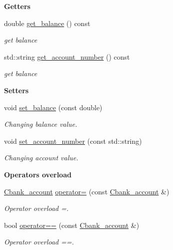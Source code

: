 \begin{Indent}{\bf Getters}\par
\begin{DoxyCompactItemize}
\item 
double \hyperlink{class_cbank__account_a3a04a3ddbbe032c369aa3cf483720f5c}{get\+\_\+balance} () const 
\begin{DoxyCompactList}\small\item\em get balance \end{DoxyCompactList}\item 
std\+::string \hyperlink{class_cbank__account_a666b0e292527ad2886f34a93789ab80d}{get\+\_\+account\+\_\+number} () const 
\begin{DoxyCompactList}\small\item\em get balance \end{DoxyCompactList}\end{DoxyCompactItemize}
\end{Indent}
\begin{Indent}{\bf Setters}\par
\begin{DoxyCompactItemize}
\item 
void \hyperlink{class_cbank__account_ab47bf4fce0d38963c39ce893553b951f}{set\+\_\+balance} (const double)
\begin{DoxyCompactList}\small\item\em Changing balance value. \end{DoxyCompactList}\item 
void \hyperlink{class_cbank__account_a920a324760772b2018fe4a4812a8eeca}{set\+\_\+account\+\_\+number} (const std\+::string)
\begin{DoxyCompactList}\small\item\em Changing account value. \end{DoxyCompactList}\end{DoxyCompactItemize}
\end{Indent}
\begin{Indent}{\bf Operator\textquotesingle{}s overload}\par
\begin{DoxyCompactItemize}
\item 
\hyperlink{class_cbank__account}{Cbank\+\_\+account} \hyperlink{class_cbank__account_ad7e7000d9b3ee72d662c2408e4e56690}{operator=} (const \hyperlink{class_cbank__account}{Cbank\+\_\+account} \&)
\begin{DoxyCompactList}\small\item\em Operator overload =. \end{DoxyCompactList}\item 
bool \hyperlink{class_cbank__account_afea50b53cab83d40a3c33e9b4fb80bf1}{operator==} (const \hyperlink{class_cbank__account}{Cbank\+\_\+account} \&)
\begin{DoxyCompactList}\small\item\em Operator overload ==. \end{DoxyCompactList}\end{DoxyCompactItemize}
\end{Indent}


